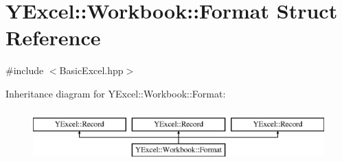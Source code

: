 \hypertarget{struct_y_excel_1_1_workbook_1_1_format}{}\section{Y\+Excel\+:\+:Workbook\+:\+:Format Struct Reference}
\label{struct_y_excel_1_1_workbook_1_1_format}


{\ttfamily \#include $<$Basic\+Excel.\+hpp$>$}

Inheritance diagram for Y\+Excel\+:\+:Workbook\+:\+:Format\+:\begin{figure}[H]
\begin{center}
\leavevmode
\includegraphics[height=2.000000cm]{struct_y_excel_1_1_workbook_1_1_format}
\end{center}
\end{figure}
